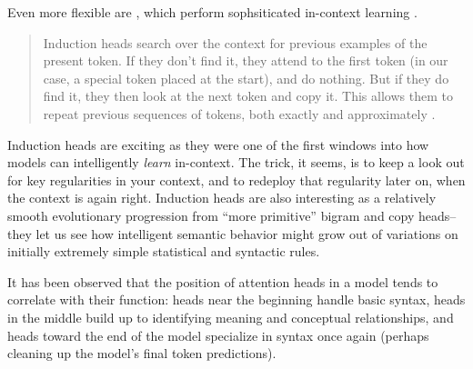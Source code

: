 Even more flexible are , which perform sophsiticated
in-context learning \cite{elhage2021mathematical,olsson2022context}.

\begin{quote}
Induction heads search over the context for previous examples of the present
token. If they don't find it, they attend to the first token (in our case, a
special token placed at the start), and do nothing. But if they do find it,
they then look at the next token and copy it. This allows them to repeat
previous sequences of tokens, both exactly and approximately \cite{elhage2021mathematical}.
\end{quote}

Induction heads are exciting as they were one of the first windows into how
models can intelligently \emph{learn} in-context. The trick, it seems, is to
keep a look out for key regularities in your context, and to redeploy that
regularity later on, when the context is again right. Induction heads are also
interesting as a relatively smooth evolutionary progression from ``more
primitive'' bigram and copy heads--they let us see how intelligent semantic
behavior might grow out of variations on initially extremely simple statistical
and syntactic rules.

It has been observed that the position of attention heads in a model tends to
correlate with their function: heads near the beginning handle basic syntax,
heads in the middle build up to identifying meaning and conceptual
relationships, and heads toward the end of the model specialize in syntax once
again (perhaps cleaning up the model's final token predictions).




